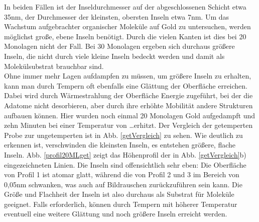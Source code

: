 In beiden Fällen ist der Inseldurchmesser auf der abgeschlossenen Schicht etwa 35nm, der Durchmesser
der kleinsten, obersten Inseln etwa 7nm. Um das Wachstum aufgebrachter organischer Moleküle auf Gold
zu untersuchen, werden möglichst große, ebene Inseln benötigt. Durch die vielen Kanten ist dies bei
20 Monolagen nicht der Fall. Bei 30 Monolagen ergeben sich durchaus größere Inseln, die nicht durch
viele kleine Inseln bedeckt werden und damit als Molekülsubstrat brauchbar sind.\\
Ohne immer mehr Lagen aufdampfen zu müssen, um größere Inseln zu erhalten, kann man durch Tempern
oft ebenfalls eine Glättung der Oberfläche erreichen. Dabei wird durch Wärmestrahlung der Oberfläche
Energie zugeführt, bei der die Adatome nicht desorbieren, aber durch ihre erhöhte Mobilität
andere Strukturen aufbauen können. Hier wurden noch einmal 20 Monolagen Gold aufgedampft und zehn
Minuten bei einer Temperatur von \ldots erhitzt. Der Vergleich der getemperten Probe zur
ungetemperten ist in Abb. \ref{getVergleich} zu sehen.
Wie deutlich zu erkennen ist, verschwinden die kleinsten Inseln, es entstehen größere, flache
Inseln. Abb. \ref{profil20MLget} zeigt das Höhenprofil der in Abb. \ref{getVergleich}b)
eingezeichneten Linien. Die Inseln sind offensichtlich sehr eben: Die Oberfläche von Profil 1 ist
atomar glatt, während die von Profil 2 und 3 im Bereich von 0,05nm schwanken, was auch auf
Bildrauschen zurückzuführen sein kann. Die Größe und Flachheit der Inseln ist also durchaus als
Substrat für Moleküle geeignet. Falls erforderlich, können durch Tempern mit höherer Temperatur
eventuell eine weitere Glättung und noch größere Inseln erreicht werden. 

